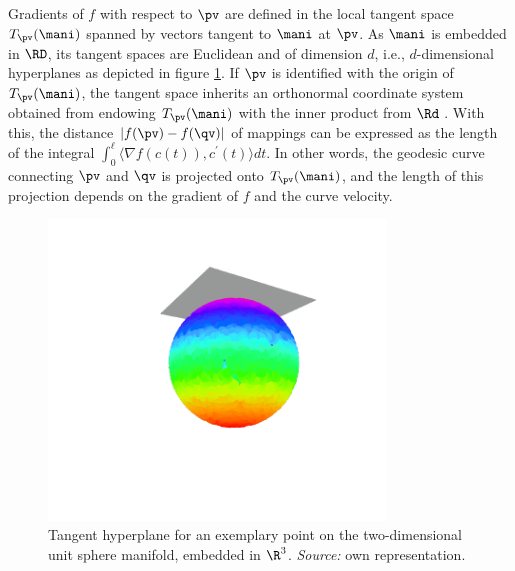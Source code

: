\begin{minipage}[b]{0.65\textwidth}
  Gradients of $f$ with respect to $\pv$ are defined in the local tangent space
  $T_{\pv}(\mani)$ spanned by vectors tangent to $\mani$ at $\pv$.
  As $\mani$ is embedded in $\RD$, its tangent spaces are Euclidean and of
  dimension $d$, i.e., $d$-dimensional hyperplanes \citep{sudderth2002} as
  depicted in figure \ref{fig:sphere-tangent}.
  If $\pv$ is identified with the origin of $T_{\pv}(\mani)$, the tangent space
  inherits an orthonormal coordinate system obtained from endowing
  $T_{\pv}(\mani)$ with the inner product from $\Rd$ \citep{donohogrimes2003}.
  With this, the distance $|f(\pv) - f(\qv)|$ of mappings can be expressed as
  the length of the integral
  $\int_0^{\ell} \langle \nabla f(c(t)), c^{\prime}(t) \rangle dt$.
  In other words, the geodesic curve connecting $\pv$ and $\qv$ is projected
  onto $T_{\pv}(\mani)$, and the length of this projection depends on the
  gradient of $f$ and the curve velocity.
\end{minipage}
\begin{minipage}[b]{0.05\textwidth}
  \phantom{xxx}
\end{minipage}
\begin{minipage}[b]{0.3\textwidth}
  \begin{figure}[H]
    \centering
    \includegraphics[trim = 90 70 60 30, clip, %
      width = 0.8\textwidth]{figures/sphere-tangent}
    \caption[Tangent hyperplane for two-dimensional unit sphere]{Tangent
    hyperplane for an exemplary point on the two-dimensional unit sphere
    manifold, embedded in $\R^3$. \textit{Source:} own representation.}
    \label{fig:sphere-tangent}
  \end{figure}
\end{minipage}

